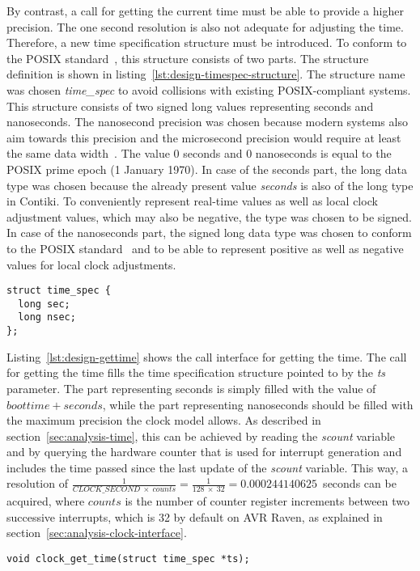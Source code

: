 By contrast, a call for getting the current time must be able to provide a higher precision.
The one second resolution is also not adequate for adjusting the time.
Therefore, a new time specification structure must be introduced.
To conform to the POSIX standard~\cite{posix}, this structure consists of two parts.
The structure definition is shown in listing~\ref{lst:design-timespec-structure}.
The structure name was chosen {\it{time\_spec}} to avoid collisions with existing POSIX-compliant systems.
This structure consists of two signed long values representing seconds and nanoseconds.
The nanosecond precision was chosen because modern systems also aim towards this precision
and the microsecond precision would require at least the same data width~\cite{posix,ntp-precision}.
The value 0 seconds and 0 nanoseconds is equal to the POSIX prime epoch (1 January 1970).
In case of the seconds part, the long data type was chosen
because the already present value {\it{seconds}} is also of the long type in Contiki.
To conveniently represent real-time values as well as local clock adjustment values, which may also be negative,
the type was chosen to be signed.
In case of the nanoseconds part, the signed long data type was chosen
to conform to the POSIX standard~\cite{posix}
and to be able to represent positive as well as negative values for local clock adjustments.
\begin{lstlisting}[caption={Time specification structure},label={lst:design-timespec-structure}]
struct time_spec {
  long sec;
  long nsec;
};
\end{lstlisting}

Listing~\ref{lst:design-gettime} shows the call interface for getting the time.
The call for getting the time fills the time specification structure
pointed to by the {\it{ts}} parameter.
The part representing seconds is simply filled with the value of $boottime + seconds$,
while the part representing nanoseconds should be filled with the maximum precision
the clock model allows.
As described in section~\ref{sec:analysis-time},
this can be achieved by reading the {\it{scount}} variable
and by querying the hardware counter that is used for
interrupt generation and includes the time passed since
the last update of the {\it{scount}} variable.
This way, a resolution of
$\frac{1}{CLOCK\_SECOND~\times~counts} = \frac{1}{128~\times~32} = 0.000244140625$~seconds
can be acquired,
where $counts$ is the number of counter register increments between two successive interrupts,
which is 32 by default on AVR Raven, as explained in section~\ref{sec:analysis-clock-interface}.
\begin{lstlisting}[caption={Call interface for getting the time},label={lst:design-gettime}]
void clock_get_time(struct time_spec *ts);
\end{lstlisting}

